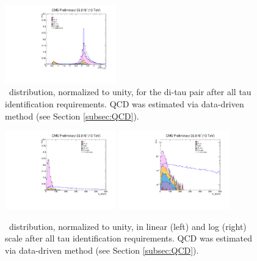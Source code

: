 \begin{figure}[H]
 \begin{center}
 \captionsetup[subfloat]{farskip=0pt,captionskip=0.0cm,labelformat=empty}
 \includegraphics[clip,width=0.43\textwidth]{figuras/Chapter5/TauID_Plots/DeltaR.pdf}
 \end{center}
 \caption{\DRt~distribution, normalized to unity, for the di-tau pair after all tau identification requirements. QCD was estimated 
 via data-driven method (see Section \ref{subsec:QCD}).}
 \label{DeltaRdistribution}
 \end{figure}


 \begin{figure}[H]
 \begin{center}
 \captionsetup[subfloat]{farskip=0pt,captionskip=0.0cm,labelformat=empty}
 \includegraphics[clip,width=0.43\textwidth]{figuras/Chapter5/TauID_Plots/MET.pdf}
 \includegraphics[clip,width=0.43\textwidth]{figuras/Chapter5/TauID_Plots/MET_log.pdf}
 \end{center}
 \caption{\MET~distribution, normalized to unity, in linear (left) and log (right) scale after all tau identification requirements. QCD was estimated 
 via data-driven method (see Section \ref{subsec:QCD}).}
 \label{MET}
 \end{figure}

